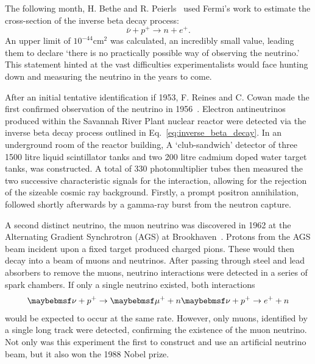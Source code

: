 The following month, H. Bethe and R. Peierls~\cite{bethe1934} used Fermi's work to estimate the
cross-section of the inverse beta decay process:
\begin{equation} %
    \bar{\nu} + p^{+} \rightarrow n + e^{+}.
    \label{eq:inverse_beta_decay}
\end{equation}
An upper limit of $10^{-44} \mathrm{cm}^2$ was calculated, an incredibly small value, leading them
to declare `there is no practically possible way of observing the neutrino.' This statement hinted
at the vast difficulties experimentalists would face hunting down and measuring the neutrino in
the years to come.

After an initial tentative identification if 1953, F. Reines and C. Cowan made the first confirmed
observation of the neutrino in 1956~\cite{cowan1956}. Electron antineutrinos produced within the
Savannah River Plant nuclear reactor were detected via the inverse beta decay process outlined in
Eq.~\ref{eq:inverse_beta_decay}. In an underground room of the reactor building, A `club-sandwich'
detector of three 1500 litre liquid scintillator tanks and two 200 litre cadmium doped water
target tanks, was constructed. A total of 330 photomultiplier tubes then measured the two
successive characteristic signals for the interaction, allowing for the rejection of the sizeable
cosmic ray background. Firstly, a prompt positron annihilation, followed shortly afterwards by a
gamma-ray burst from the neutron capture.

A second distinct neutrino, the muon neutrino was discovered in 1962 at the Alternating Gradient
Synchrotron (AGS) at Brookhaven~\cite{danby1962}. Protons from the AGS beam incident upon a fixed
target produced charged pions. These would then decay into a beam of muons and neutrinos. After
passing through steel and lead absorbers to remove the muons, neutrino interactions were detected
in a series of spark chambers. If only a single neutrino existed, both interactions
\begin{equation} %
    \nu+p^{+}\rightarrow\mu^{+}+n \\
    \nu+p^{+}\rightarrow e^{+}+n
\end{equation}
would be expected to occur at the same rate. However, only muons, identified by a single long
track were detected, confirming the existence of the muon neutrino. Not only was this experiment
the first to construct and use an artificial neutrino beam, but it also won the 1988 Nobel prize.

